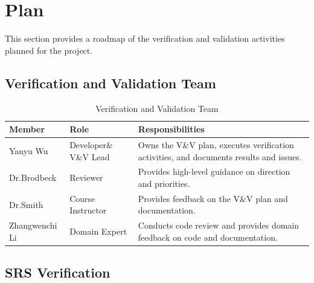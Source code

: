\documentclass[12pt, titlepage]{article}
\begin{document}

\newpage

\section{Plan}
This section provides a roadmap of the verification and validation activities planned for the project.


\subsection{Verification and Validation Team}

\begin{table}[h!]
\centering
\begin{tabularx}{\textwidth}{p{} p{} X}
\toprule
\textbf{Member} & \textbf{Role} & \textbf{Responsibilities} \\
\midrule
Yanyu Wu & Developer\&  V\&V Lead & Owns the V\&V plan, executes verification activities, and documents results and issues. \\
Dr.Brodbeck & Reviewer & Provides high-level guidance on direction and priorities. \\
Dr.Smith & Course Instructor & Provides feedback on the V\&V plan and documentation. \\
Zhangwenchi Li & Domain Expert & Conducts code review and provides domain feedback on code and documentation. \\
\bottomrule
\end{tabularx}
\caption{Verification and Validation Team}
\label{tab:vv_team}
\end{table}


\subsection{SRS Verification}
\end{document}

